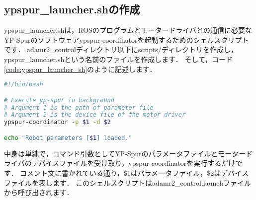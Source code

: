 \documentclass[{../../master}]{subfiles}
\begin{document}
\subsection{\textsf{ypspur\_launcher.sh}の作成}

\textsf{ypspur\_launcher.sh}は，ROSのプログラムとモータードライバとの通信に必要なYP-Spurのソフトウェア\textsf{ypspur-coordinator}を起動するためのシェルスクリプトです．
\textsf{adamr2\_control}ディレクトリ以下に\textsf{scripts/}ディレクトリを作成し，\textsf{ypspur\_launcher.sh}という名前のファイルを作成します．
そして，コード\ref{code:ypspur_launcher_sh}のように記述します．

\begin{lstlisting}[language=sh, label=code:ypspur_launcher_sh, caption=\textsf{ypspur\_launcher.sh}]
#!/bin/bash

# Execute yp-spur in background
# Argument 1 is the path of parameter file
# Argument 2 is the device file of the motor driver
ypspur-coordinator -p $1 -d $2

echo "Robot parameters [$1] loaded."
\end{lstlisting}

中身は単純で，コマンド引数としてYP-Spurのパラメータファイルとモータードライバのデバイスファイルを受け取り，\textsf{ypspur-coordinator}を実行するだけです．
コメント文に書かれている通り，\textsf{\$1}はパラメータファイル，\textsf{\$2}はデバイスファイルを表します．
このシェルスクリプトは\textsf{adamr2\_control.launch}ファイルから呼び出されます．
\end{document}
